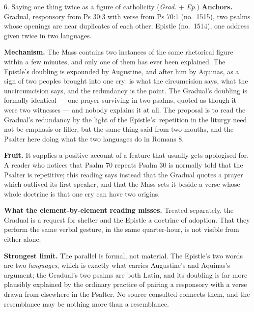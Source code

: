\begin{proposal}{6. Saying one thing twice as a figure of catholicity
\normalfont(\emph{Grad.} + \emph{Ep.})}
\textbf{Anchors.} Gradual, responsory from Ps 30:3 with verse from Ps 70:1
(no.\ 1515), two psalms whose openings are near duplicates of each other;
Epistle  (no.\ 1514), one address given
twice in two languages.

\textbf{Mechanism.} The Mass contains two instances of the same rhetorical
figure within a few minutes, and only one of them has ever been explained. The
Epistle's doubling is expounded by Augustine, and after him by Aquinas, as a
sign of two peoples brought into one cry:  is what the circumcision
says,  what the uncircumcision says, and the redundancy is the
point. The Gradual's doubling is formally identical --- one prayer surviving in
two psalms, quoted as though it were two witnesses --- and nobody explains it at
all. The proposal is to read the Gradual's redundancy by the light of the
Epistle's: repetition in the liturgy need not be emphasis or filler, but the
same thing said from two mouths, and the Psalter here doing what the two
languages do in Romans 8.

\textbf{Fruit.} It supplies a positive account of a feature that usually gets
apologised for. A reader who notices that Psalm 70 repeats Psalm 30 is normally
told that the Psalter is repetitive; this reading says instead that the Gradual
quotes a prayer which outlived its first speaker, and that the Mass sets it
beside a verse whose whole doctrine is that one cry can have two origins.

\textbf{What the element-by-element reading misses.} Treated separately, the
Gradual is a request for shelter and the Epistle a doctrine of adoption. That
they perform the same verbal gesture, in the same quarter-hour, is not visible
from either alone.

\textbf{Strongest limit.} The parallel is formal, not material. The Epistle's
two words are two \emph{languages}, which is exactly what carries Augustine's
and Aquinas's argument; the Gradual's two psalms are both Latin, and its
doubling is far more plausibly explained by the ordinary practice of pairing a
responsory with a verse drawn from elsewhere in the Psalter. No source consulted
connects them, and the resemblance may be nothing more than a resemblance.
\end{proposal}
